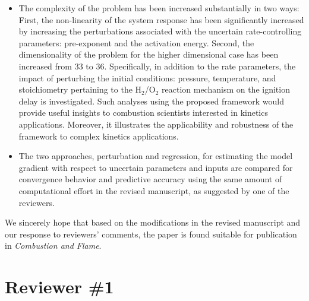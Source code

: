 \documentclass[11pt,final]{article}
\begin{document}
\begin{itemize}

\item The complexity of the problem has been increased substantially in two ways: First, 
the non-linearity of the system response has been significantly increased by increasing
the perturbations associated with the uncertain rate-controlling parameters: pre-exponent
and the activation energy. Second, the dimensionality of the problem for the higher
dimensional case has been increased from 33 to 36.
Specifically, in addition to the rate parameters, the impact of
perturbing the initial conditions: pressure, temperature, and stoichiometry pertaining to the
H$_2$/O$_2$ reaction mechanism on the ignition delay is investigated. Such analyses using the
proposed framework would provide useful insights to combustion scientists interested in
kinetics applications. Moreover, it illustrates the applicability and robustness of the 
framework to complex kinetics applications. 

\item The two approaches, perturbation and regression, for estimating the model gradient
with respect to uncertain parameters and inputs are compared for convergence behavior and
predictive accuracy using the same amount of
computational effort in the revised manuscript, as suggested by one of the reviewers. 

\end{itemize} 

We sincerely hope that based on the modifications in the revised manuscript and our 
response to reviewers' comments, the paper is found suitable for publication in
{\it Combustion and Flame}. 

\clearpage


\section*{Reviewer \#1}
\end{document}
